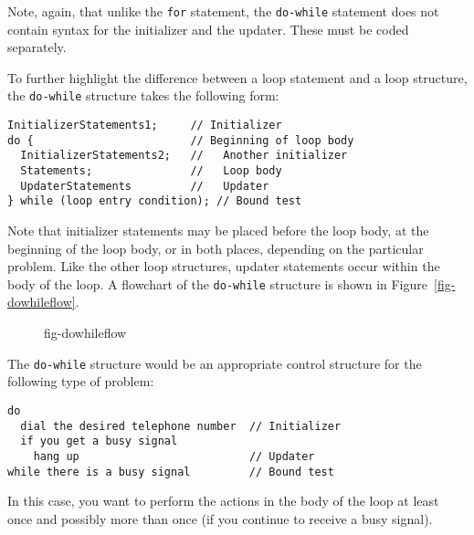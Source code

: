 \noindent Note, again, that unlike the {\tt for} statement, the {\tt do-while}
statement does not contain syntax for the initializer and the updater.
These must be coded separately.

To further highlight the difference between a loop statement and a
loop structure, the {\tt do-while} structure takes the following
form:

\begin{jjjlisting}
\begin{lstlisting}
InitializerStatements1;     // Initializer
do {                        // Beginning of loop body
  InitializerStatements2;   //   Another initializer
  Statements;               //   Loop body
  UpdaterStatements         //   Updater
} while (loop entry condition); // Bound test
\end{lstlisting}
\end{jjjlisting}

\noindent Note that initializer statements may be placed
before the loop body, at the beginning of the loop body, or in
both places, depending on the particular problem. Like the other loop
structures, updater statements occur within the body of the loop.  A
flowchart of the {\tt do-while} structure is shown in
Figure~\ref{fig-dowhileflow}.

\begin{figure}[t]
 {fig-dowhileflow}

\end{figure}

The {\tt do-while} structure would be an appropriate control structure
for the following type of problem:

\begin{jjjlisting}
\begin{lstlisting}[stringstyle=\color{black}]
do
  dial the desired telephone number  // Initializer
  if you get a busy signal
    hang up                          // Updater
while there is a busy signal         // Bound test
\end{lstlisting}
\end{jjjlisting}

\noindent In this case, you want to perform the actions in
the body of the loop at least once and possibly more than
once (if you continue to receive a busy signal).


